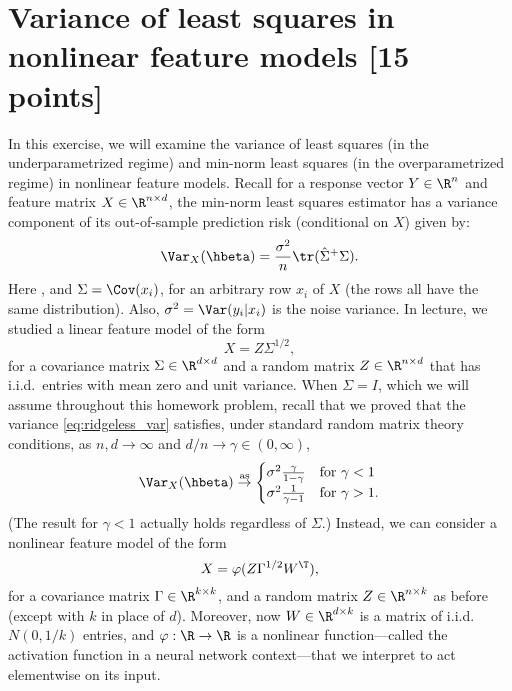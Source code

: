 \documentclass{article}
\begin{document}
\section{Variance of least squares in nonlinear feature models [15 points]} 

\def\asto{\overset{\mathrm{as}}{\to}}
\def\hSigma{\hat\Sigma}

In this exercise, we will examine the variance of least squares (in the
underparametrized regime) and min-norm least squares (in the overparametrized 
regime) in nonlinear feature models. Recall for a response vector $Y \in \R^n$
and feature matrix $X \in \R^{n \times d}$, the min-norm least squares estimator 
 has a variance component of its
out-of-sample prediction risk (conditional on $X$) given by:
\begin{equation}
\label{eq:ridgeless_var}
\Var_X(\hbeta) = \frac{\sigma^2}{n} \tr (\hSigma^+ \Sigma).
\end{equation}
Here \smash{$\hSigma = X^\T X/n$}, and $\Sigma = \Cov(x_i)$, for an arbitrary
row $x_i$ of $X$ (the rows all have the same distribution). Also, $\sigma^2 =
\Var(y_i | x_i)$ is the noise variance. In lecture, we studied a linear feature 
model of the form    
\begin{equation}
\label{eq:linear_features}
X = Z \Sigma^{1/2},
\end{equation}
for a covariance matrix $\Sigma \in \R^{d \times d}$ and a random matrix $Z \in
\R^{n \times d}$ that has i.i.d.\ entries with mean zero and unit variance. When
$\Sigma = I$, which we will assume throughout this homework problem, recall that
we proved that the variance \eqref{eq:ridgeless_var} satisfies, under standard 
random matrix theory conditions, as $n,d \to \infty$ and $d/n \to \gamma \in 
(0,\infty)$, 
\begin{equation}
\label{eq:ridgeless_var_iso_limit}
\Var_X(\hbeta) \asto 
\begin{cases}
\sigma^2 \frac{\gamma}{1-\gamma} & \text{for $\gamma < 1$} \\ 
\sigma^2 \frac{1}{\gamma-1} & \text{for $\gamma > 1$}.
\end{cases}
\end{equation}
(The result for $\gamma < 1$ actually holds regardless of $\Sigma$.) Instead, we
can consider a nonlinear feature model of the form 
\begin{equation}
\label{eq:nonlinear_features}
X = \varphi(Z \Gamma^{1/2} W^\T),
\end{equation}
for a covariance matrix $\Gamma \in \R^{k \times k}$, and a random matrix $Z \in
\R^{n \times k}$ as before (except with $k$ in place of $d$). Moreover, now $W
\in \R^{d \times k}$ is a matrix of i.i.d.\ $N(0,1/k)$ entries, and $\varphi :
\R \to \R$ is a nonlinear function---called the activation function in a neural
network context---that we interpret to act elementwise on its input. 
\end{document}
